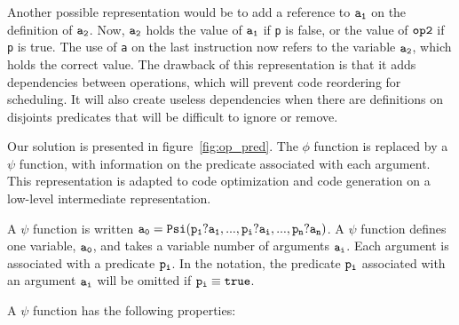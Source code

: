 Another possible representation would be to add a reference to ${\tt
  a_1}$ on the definition of ${\tt a_2}$. Now, ${\tt a_2}$ holds the
value of ${\tt a_1}$ if {\tt p} is false, or the value of ${\tt op2}$
if {\tt p} is true. The use of {\tt a} on the last instruction now
refers to the variable ${\tt a_2}$, which holds the correct value. The
drawback of this representation is that it adds dependencies between
operations, which will prevent code reordering for scheduling. It will
also create useless dependencies when there are definitions on
disjoints predicates that will be difficult to ignore or remove.

Our solution is presented in figure~\ref{fig:op_pred}. The $\phi$
function is replaced by a $\psi$ function, with information on the
predicate associated with each argument. This representation is
adapted to code optimization and code generation on a low-level
intermediate representation.

A $\psi$ function is written ${\tt a_0 = Psi(p_1?a_1, ..., p_i?a_i,
  ..., p_n?a_n)}$. A $\psi$ function defines one variable, ${\tt
  a_0}$, and takes a variable number of arguments ${\tt a_i}$. Each
argument is associated with a predicate ${\tt p_i}$. In the notation,
the predicate ${\tt p_i}$ associated with an argument ${\tt a_i}$ will
be omitted if ${\tt p_i \equiv true}$.

A $\psi$ function has the following properties:

